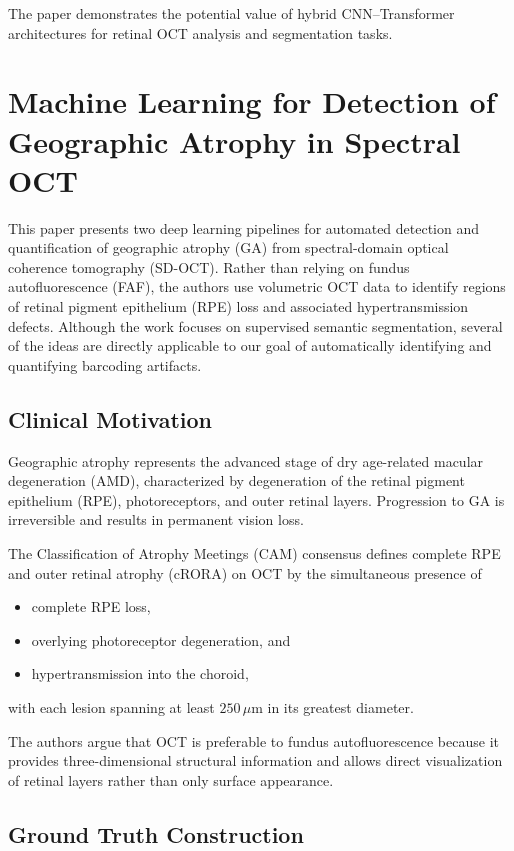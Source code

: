 \documentclass[11pt]{article}
\begin{document}
The paper demonstrates the potential value of hybrid CNN--Transformer architectures for retinal OCT analysis and segmentation tasks.

\section{Machine Learning for Detection of Geographic Atrophy in Spectral OCT}

This paper presents two deep learning pipelines for automated detection and quantification of geographic atrophy (GA) from spectral-domain optical coherence tomography (SD-OCT). Rather than relying on fundus autofluorescence (FAF), the authors use volumetric OCT data to identify regions of retinal pigment epithelium (RPE) loss and associated hypertransmission defects. Although the work focuses on supervised semantic segmentation, several of the ideas are directly applicable to our goal of automatically identifying and quantifying barcoding artifacts.

\subsection{Clinical Motivation}

Geographic atrophy represents the advanced stage of dry age-related macular degeneration (AMD), characterized by degeneration of the retinal pigment epithelium (RPE), photoreceptors, and outer retinal layers. Progression to GA is irreversible and results in permanent vision loss.

The Classification of Atrophy Meetings (CAM) consensus defines complete RPE and outer retinal atrophy (cRORA) on OCT by the simultaneous presence of

\begin{itemize}
    \item complete RPE loss,
    \item overlying photoreceptor degeneration, and
    \item hypertransmission into the choroid,
\end{itemize}

with each lesion spanning at least $250\,\mu$m in its greatest diameter.

The authors argue that OCT is preferable to fundus autofluorescence because it provides three-dimensional structural information and allows direct visualization of retinal layers rather than only surface appearance.

\subsection{Ground Truth Construction}
\end{document}
